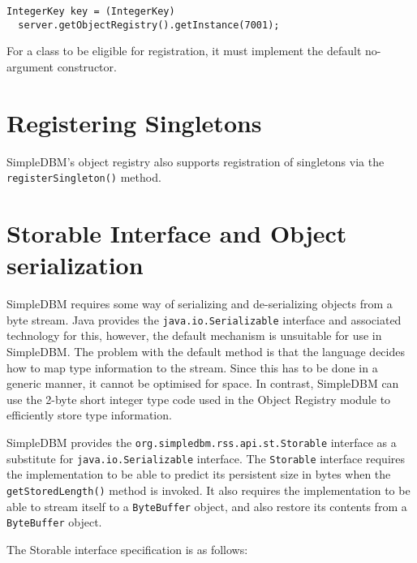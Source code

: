 \documentclass[a4paper,draft,oneside]{book}
\begin{document}
\begin{verbatim}
IntegerKey key = (IntegerKey) 
  server.getObjectRegistry().getInstance(7001);
\end{verbatim}

For a class to be eligible for registration, it must implement the
default no-argument constructor.

\section{Registering Singletons}
SimpleDBM's object registry also supports registration of
singletons via the \verb|registerSingleton()| method. 

\section{Storable Interface and Object serialization}
SimpleDBM requires some way of serializing and de-serializing
objects from a byte stream. Java provides the \verb|java.io.Serializable|
interface and associated technology for this, however, the default
mechanism is unsuitable for use in SimpleDBM. The problem with the
default method is that the language decides how to map type
information to the stream. Since this has to be done in a generic
manner, it cannot be optimised for space. In contrast, SimpleDBM can
use the 2-byte short integer type code used in the Object Registry
module to efficiently store type information.

SimpleDBM provides the \verb|org.simpledbm.rss.api.st.Storable|
interface as a substitute for \verb|java.io.Serializable|
interface. The \verb|Storable| interface requires the implementation
to be able to predict its persistent size in bytes when the
\verb|getStoredLength()| method is invoked. It also requires the
implementation to be able to stream itself to a \verb|ByteBuffer|
object, and also restore its contents from a \verb|ByteBuffer| object.

The Storable interface specification is as follows:
\end{document}
